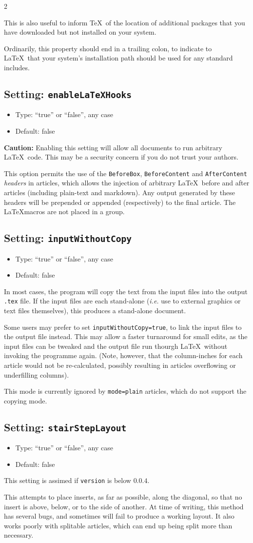 \documentclass[a4paper,DIV=11]{scrartcl}
\newcommand{\property}[5]{
  \subsection{#1: \texttt{#2}}
  \begin{itemize}
  \item Type: #3
  \item Default: #4
  \end{itemize}
  #5
}
\newcommand{\setting}{\property{Setting}}
\begin{document}
\begin{multicols}{2}
{  This is also useful to inform \TeX\ of the location of additional
  packages that you have downloaded but not installed on your system.\par
  Ordinarily, this property should end in a trailing colon, to
  indicate to \LaTeX\ that your system's installation path should be
  used for any standard includes.\par
}
\setting{enableLaTeXHooks}{``true'' or ``false'', any case}{false}{
  \textbf{Caution:} Enabling this setting will allow all documents to
  run arbitrary \LaTeX\ code. This may be a security concern if you do
  not trust your authors.\par
  This option permits the use of the \texttt{BeforeBox}, \texttt{BeforeContent} and
  \texttt{AfterContent} \textit{headers} in articles, which allows the
  injection of arbitrary \LaTeX\ before and after articles (including
  plain-text and markdown). Any output generated by these headers will
  be prepended or appended (respectively) to the final article. The
  \LaTeX macros are not placed in a group.
}
\setting{inputWithoutCopy}{``true'' or ``false'', any case}{false}{
  In most cases, the program will copy the text from the input files
  into the output \texttt{.tex} file. If the input files are each
  stand-alone (\textit{i.e.} use to external graphics or text files
  themselves), this produces a stand-alone document. \par
  Some users may prefer to set \texttt{inputWithoutCopy=true}, to link
  the input files to the output file instead. This may allow a faster
  turnaround for small edits, as the input files can be tweaked and
  the output file run thourgh \LaTeX\ without invoking the programme
  again. (Note, however, that the column-inches for each article would
  not be re-calculated, possibly resulting in articles overflowing or
  underfilling columns).\par
  This mode is currently ignored by \texttt{mode=plain} articles,
  which do not support the copying mode.
}
\setting{stairStepLayout}{``true'' or ``false'', any case}{false}{
  This setting is assimed if \texttt{version} is below $0.0.4$.

  This attempts to place inserts, as far as possible, along the
  diagonal, so that no insert is above, below, or to the side of
  another. At time of writing, this method has several bugs, and
  sometimes will fail to produce a working layout. It also works
  poorly with splitable articles, which can end up being split more
  than necessary.

}
\end{multicols}
\end{document}
